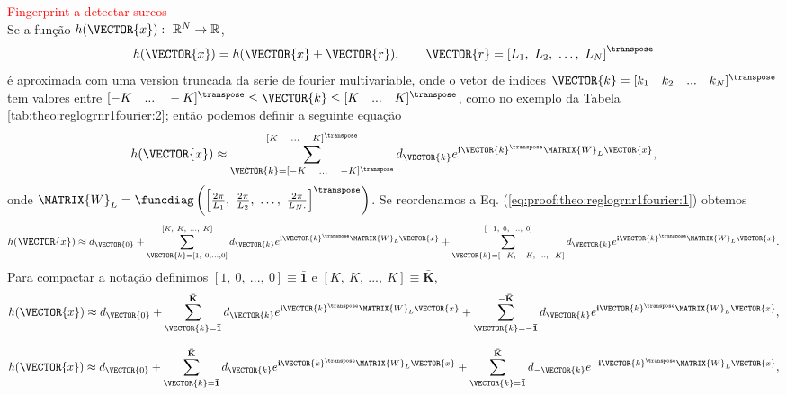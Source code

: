 \begin{myproofT}
\label{proof:theo:reglogrnr1fourier}
\textcolor{red}{Fingerprint a detectar surcos}\\
Se a função $h(\VECTOR{x}):~\mathbb{R}^{N} \rightarrow \mathbb{R}$,
\begin{equation}
h(\VECTOR{x}) = h(\VECTOR{x}+\VECTOR{r}),\qquad 
\VECTOR{r}=\left[L_1,~L_2,~\dots,~L_N\right]^{\transpose}
\end{equation}
é aproximada com uma 
version truncada da serie de fourier multivariable, 
onde o vetor de indices 
$\VECTOR{k}=[k_1\quad k_2\quad  ...\quad k_N]^{\transpose}$ tem valores entre 
$[-K\quad ...\quad-K]^{\transpose} \leq  \VECTOR{k}\leq [K\quad ...\quad K]^{\transpose}$,
como no exemplo da Tabela \ref{tab:theo:reglogrnr1fourier:2}; 
então podemos definir a seguinte equação
\begin{equation}\label{eq:proof:theo:reglogrnr1fourier:1}
 h(\VECTOR{x}) \approx
\sum_{\VECTOR{k}=[-K\quad ...\quad-K]^{\transpose}}^{[K\quad ...\quad K]^{\transpose}}
d_{\VECTOR{k}}  e^{\mathbf{i}\VECTOR{k}^{\transpose}\MATRIX{W}_{L}\VECTOR{x}}, 
\end{equation}
onde 
$\MATRIX{W}_{L}=\funcdiag\left(\left[\frac{2 \pi}{L_1},~\frac{2 \pi}{L_2},~\dots,~\frac{2 \pi}{L_N.}\right]^{\transpose}\right)$.
Se reordenamos a Eq. (\ref{eq:proof:theo:reglogrnr1fourier:1}) obtemos
\begin{equation}
 h(\VECTOR{x}) \approx d_{\VECTOR{0}}+
\sum_{\VECTOR{k}=[1,~0, ...,0]}^{[K,~K,~ ...,~K]}
d_{\VECTOR{k}}  e^{\mathbf{i}\VECTOR{k}^{\transpose}\MATRIX{W}_{L}\VECTOR{x}}
+
\sum_{\VECTOR{k}=[-K,~-K,~ ...,-K]}^{[-1,~0,~...,~0]}
d_{\VECTOR{k}}  e^{\mathbf{i}\VECTOR{k}^{\transpose}\MATRIX{W}_{L}\VECTOR{x}}.
\end{equation}
Para compactar a notação definimos $[1,~ 0,~ ...,~ 0 ]\equiv \mathbf{\bar{1}}$
e $[K,~ K,~ ...,~K ]\equiv \mathbf{\bar{K}}$,
\begin{equation}
 h(\VECTOR{x}) \approx d_{\VECTOR{0}}+
\sum_{\VECTOR{k}=\mathbf{\bar{1}}}^{\mathbf{\bar{K}}}
d_{\VECTOR{k}}  e^{\mathbf{i}\VECTOR{k}^{\transpose}\MATRIX{W}_{L}\VECTOR{x}}
+
\sum_{\VECTOR{k}=-\mathbf{\bar{1}}}^{-\mathbf{\bar{K}}}
d_{\VECTOR{k}}  e^{\mathbf{i}\VECTOR{k}^{\transpose}\MATRIX{W}_{L}\VECTOR{x}},
\end{equation}

\begin{equation}
 h(\VECTOR{x}) \approx d_{\VECTOR{0}}+
\sum_{\VECTOR{k}=\mathbf{\bar{1}}}^{\mathbf{\bar{K}}}
d_{\VECTOR{k}}  e^{\mathbf{i}\VECTOR{k}^{\transpose}\MATRIX{W}_{L}\VECTOR{x}}
+
\sum_{\VECTOR{k}=\mathbf{\bar{1}}}^{\mathbf{\bar{K}}}
d_{-\VECTOR{k}}  e^{-\mathbf{i}\VECTOR{k}^{\transpose}\MATRIX{W}_{L}\VECTOR{x}},
\end{equation}


\end{myproofT}
